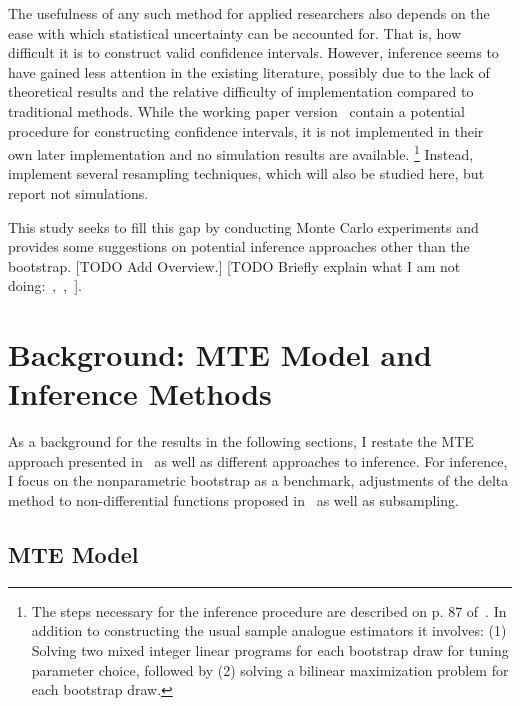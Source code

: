 \documentclass[12pt,a4paper,english]{article} %
\numberwithin{equation}{section}
\theoremstyle{definition}
\theoremstyle{remark}
\theoremstyle{plain}
\begin{document}
The usefulness of any such method for applied researchers also depends on the ease with which statistical uncertainty can be accounted for.
That is, how difficult it is to construct valid confidence intervals.
However, inference seems to have gained less attention in the existing literature, possibly due to the lack of theoretical results and the relative difficulty of implementation compared to traditional methods.
While the working paper version~\cite{mogstad2017using_nber} contain a potential procedure for constructing confidence intervals, it is not implemented in their own later implementation \citep{shea2023ivmte} and no simulation results are available.
\footnote{The steps necessary for the inference procedure are described on p. 87 of~\cite{mogstad2017using_nber}.
In addition to constructing the usual sample analogue estimators it involves: (1) Solving two mixed integer linear programs for each bootstrap draw for tuning parameter choice, followed by (2) solving a bilinear maximization problem for each bootstrap draw.}
Instead,~\cite{shea2023ivmte} implement several resampling techniques, which will also be studied here, but report not simulations.

This study seeks to fill this gap by conducting Monte Carlo experiments and provides some suggestions on potential inference approaches other than the bootstrap.
[TODO Add Overview.]
[TODO Briefly explain what I am not doing:~\cite{bei2023inference},~\cite{bhattacharya2009inferring},~\cite{freyberger2015identification}].

\section{Background: MTE Model and Inference Methods}\label{sec:general_mte}
As a background for the results in the following sections, I restate the MTE approach presented in~\cite{mogstad2018using} as well as different approaches to inference.
For inference, I focus on the nonparametric bootstrap as a benchmark, adjustments of the delta method to non-differential functions proposed in~\cite{fang2019infdirdiff} as well as subsampling.

\subsection{MTE Model}
\end{document}
